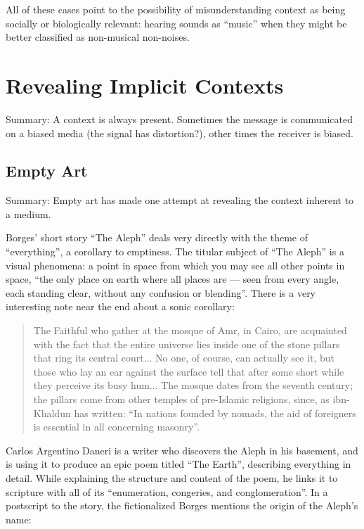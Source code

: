 \documentclass{thesis}
\begin{document}
All of these cases point to the possibility of misunderstanding context as being socially or biologically relevant: hearing sounds as ``music'' when they might be better classified as non-musical non-noises.

\chapter{Revealing Implicit Contexts}
	
	Summary: A context is always present. Sometimes the message is communicated on a biased media (the signal has distortion?), other times the receiver is biased.

\section{Empty Art}

	Summary: Empty art has made one attempt at revealing the context inherent to a medium.

	Borges' short story ``The Aleph''\cite{borges_aleph_2004} deals very directly with the theme of ``everything'', a corollary to emptiness. The titular subject of ``The Aleph'' is a visual phenomena: a point in space from which you may see all other points in space, ``the only place on earth where all places are --- seen from every angle, each standing clear, without any confusion or blending''. There is a very interesting note near the end about a sonic corollary:
	
	\begin{quote}
	The Faithful who gather at the mosque of Amr, in Cairo, are acquainted with the fact that the entire universe lies inside one of the stone pillars that ring its central court... No one, of course, can actually see it, but those who lay an ear against the surface tell that after some short while they perceive its busy hum... The mosque dates from the seventh century; the pillars come from other temples of pre-Islamic religions, since, as ibn-Khaldun has written: ``In nations founded by nomads, the aid of foreigners is essential in all concerning masonry''.
	\end{quote}
	
	Carlos Argentino Daneri is a writer who discovers the Aleph in his basement, and is using it to produce an epic poem titled ``The Earth'', describing everything in detail. While explaining the structure and content of the poem, he links it to scripture with all of its ``enumeration, congeries, and conglomeration''. In a postscript to the story, the fictionalized Borges mentions the origin of the Aleph's name:
	
\end{document}
